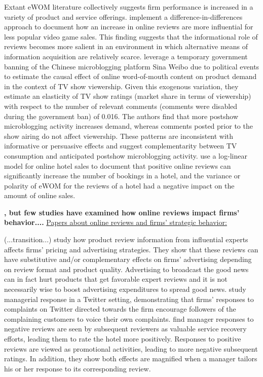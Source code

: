 Extant eWOM literature collectively suggests firm performance is increased in a variety of product and service offerings. \citet{zhu2010impact} implement a difference-in-differences approach to document how an increase in online reviews are more influential for less popular video game sales. This finding suggests that the informational role of reviews becomes more salient in an environment in which alternative means of information acquisition are relatively scarce. \citet{seiler2017does} leverage a temporary government banning of the Chinese microblogging platform Sina Weibo due to political events to estimate the causal effect of online word-of-mouth content on product demand in the context of TV show viewership. Given this exogenous variation, they estimate an elasticity of TV show ratings (market share in terms of viewership) with respect to the number of relevant comments (comments were disabled during the government ban) of 0.016. The authors find that more postshow microblogging activity increases demand, whereas comments posted prior to the show airing do not affect viewership. These patterns are inconsistent with informative or persuasive effects and suggest complementarity between TV consumption and anticipated postshow microblogging activity. \citet{ye2009impact} use a log-linear model for online hotel sales to document that positive online reviews can significantly increase the number of bookings in a hotel, and the variance or polarity of eWOM for the reviews of a hotel had a negative impact on the amount of online sales.   

\textbf{, but few studies have examined how online reviews impact firms' behavior....}
\underline{Papers about online reviews and firms' strategic behavior:}

(...transition...) \citet{chen2005third} study how product review information from influential experts affects firms’ pricing and advertising strategies. They show that these reviews can have substitutive and/or complementary effects on firms’ advertising depending on review format and product quality. Advertising to broadcast the good news can in fact hurt products that get favorable expert reviews and it is not necessarily wise to boost advertising expenditures to spread good news.
\citet{ma2015squeaky} study managerial response in a Twitter setting, demonstrating that firms' responses to complaints on Twitter directed towards the firm encourage followers of the complaining customers to voice their own complaints. \citet{wang2018and} find manager responses to negative reviews are seen by subsequent reviewers as valuable service recovery efforts, leading them to rate the hotel more positively. Responses to positive reviews are viewed as promotional activities, leading to more negative subsequent ratings. In addition, they show both effects are magnified when a manager tailors his or her response to its corresponding review. 


